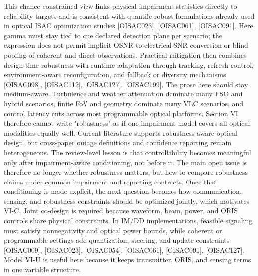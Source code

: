 {}This chance-constrained view links physical impairment statistics directly to reliability targets and is consistent with quantile-robust formulations already used in optical ISAC optimization studies [O\markdownRendererUnderscore{}ISAC\markdownRendererUnderscore{}023], [O\markdownRendererUnderscore{}ISAC\markdownRendererUnderscore{}061], [O\markdownRendererUnderscore{}ISAC\markdownRendererUnderscore{}091]. Here \markdownRendererDollarSign{}\markdownRendererBackslash{}gamma\markdownRendererDollarSign{} must stay tied to one declared detection plane per scenario; the expression does not permit implicit OSNR-to-electrical-SNR conversion or blind pooling of coherent and direct observations. Practical mitigation then combines design-time robustness with runtime adaptation through tracking, refresh control, environment-aware reconfiguration, and fallback or diversity mechanisms [O\markdownRendererUnderscore{}ISAC\markdownRendererUnderscore{}098], [O\markdownRendererUnderscore{}ISAC\markdownRendererUnderscore{}112], [O\markdownRendererUnderscore{}ISAC\markdownRendererUnderscore{}127], [O\markdownRendererUnderscore{}ISAC\markdownRendererUnderscore{}199].\markdownRendererParagraphSeparator
{}The prose here should stay medium-aware. Turbulence and weather attenuation dominate many FSO and hybrid scenarios, finite FoV and geometry dominate many VLC scenarios, and control latency cuts across most programmable optical platforms. Section VI therefore cannot write "robustness" as if one impairment model covers all optical modalities equally well.\markdownRendererParagraphSeparator
{} Current literature supports robustness-aware optical design, but cross-paper outage definitions and confidence reporting remain heterogeneous. The review-level lesson is that controllability becomes meaningful only after impairment-aware conditioning, not before it. The main open issue is therefore no longer whether robustness matters, but how to compare robustness claims under common impairment and reporting contracts. Once that conditioning is made explicit, the next question becomes how communication, sensing, and robustness constraints should be optimized jointly, which motivates VI-C.\markdownRendererInterblockSeparator
{}
\markdownRendererSectionEnd \markdownRendererSectionBegin
{}\markdownRendererInterblockSeparator
{}Joint co-design is required because waveform, beam, power, and ORIS controls share physical constraints. In IM/DD implementations, feasible signaling must satisfy nonnegativity and optical power bounds, while coherent or programmable settings add quantization, steering, and update constraints [O\markdownRendererUnderscore{}ISAC\markdownRendererUnderscore{}009], [O\markdownRendererUnderscore{}ISAC\markdownRendererUnderscore{}023], [O\markdownRendererUnderscore{}ISAC\markdownRendererUnderscore{}054], [O\markdownRendererUnderscore{}ISAC\markdownRendererUnderscore{}061], [O\markdownRendererUnderscore{}ISAC\markdownRendererUnderscore{}091], [O\markdownRendererUnderscore{}ISAC\markdownRendererUnderscore{}127]. Model VI-U is useful here because it keeps transmitter, ORIS, and sensing terms in one variable structure.\markdownRendererParagraphSeparator
